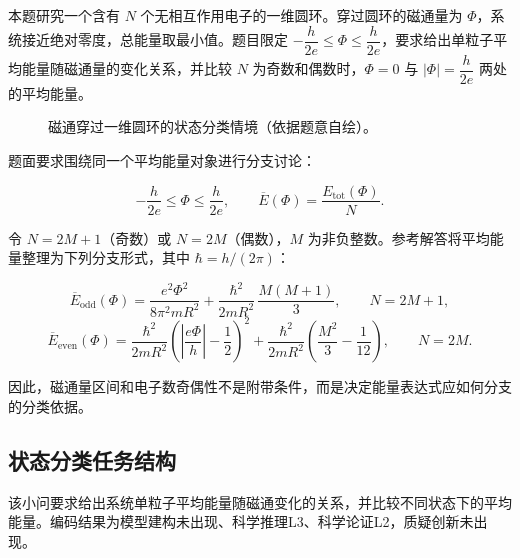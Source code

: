 \documentclass[
  12pt,
  a4paper,twoside,openany]{ctexbook}
\begin{document}
本题研究一个含有 \(N\) 个无相互作用电子的一维圆环。穿过圆环的磁通量为
\(\Phi\)，系统接近绝对零度，总能量取最小值。题目限定
\(-\dfrac{h}{2e}\leq\Phi\leq\dfrac{h}{2e}\)，要求给出单粒子平均能量随磁通量的变化关系，并比较
\(N\) 为奇数和偶数时，\(\Phi=0\) 与 \(|\Phi|=\dfrac{h}{2e}\)
两处的平均能量。

\begin{figure}[H]
\centering
{}
\caption{磁通穿过一维圆环的状态分类情境（依据题意自绘）。}
\end{figure}

题面要求围绕同一个平均能量对象进行分支讨论：

\[
-\frac{h}{2e}\leq \Phi\leq\frac{h}{2e},
\qquad
\overline{E}(\Phi)=\frac{E_{\mathrm{tot}}(\Phi)}{N}.
\]

令 \(N=2M+1\)（奇数）或 \(N=2M\)（偶数），\(M\)
为非负整数。参考解答将平均能量整理为下列分支形式，其中
\(\hbar=h/(2\pi)\)：

\[
\overline{E}_{\mathrm{odd}}(\Phi)
=\frac{e^2\Phi^2}{8\pi^2mR^2}
+\frac{\hbar^2}{2mR^2}\,\frac{M(M+1)}{3},
\qquad N=2M+1,
\]
\[
\overline{E}_{\mathrm{even}}(\Phi)
=\frac{\hbar^2}{2mR^2}
 \left(\left|\frac{e\Phi}{h}\right|-\frac12\right)^2
+\frac{\hbar^2}{2mR^2}
 \left(\frac{M^2}{3}-\frac1{12}\right),
\qquad N=2M.
\]

因此，磁通量区间和电子数奇偶性不是附带条件，而是决定能量表达式应如何分支的分类依据。

\subsection{状态分类任务结构}\label{ux72b6ux6001ux5206ux7c7bux4efbux52a1ux7ed3ux6784}

该小问要求给出系统单粒子平均能量随磁通变化的关系，并比较不同状态下的平均能量。编码结果为模型建构未出现、科学推理L3、科学论证L2，质疑创新未出现。
\end{document}
